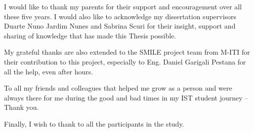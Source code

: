 
I would like to thank my parents for their support and encouragement over all these five years.  I would also like to acknowledge my dissertation supervisors Duarte Nuno Jardim Nunes and Sabrina Scuri for their insight, support and sharing of knowledge that has made this Thesis possible.


My grateful thanks are also extended to the SMILE project team from M-ITI for their contribution to this project, especially to Eng. Daniel Garigali Pestana for all the help, even after hours. 

To all my friends and colleagues that helped me grow as a person and were always there for me during the good and bad times in my IST student journey -- Thank you.

Finally, I wish to thank to all the participants in the study.



